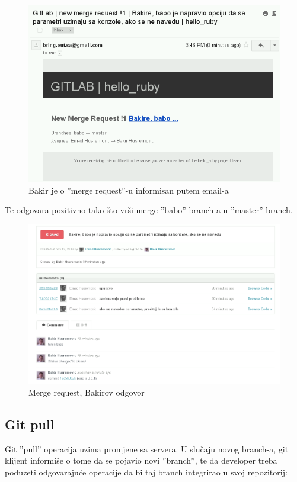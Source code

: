 \documentclass[times, utf8, seminar]{fit}
\begin{document}
\begin{figure}[H]
\centering
\includegraphics[width=15cm]{img/gitlab_merge_request_email_notification.png}
\caption{Bakir je o ''merge request''-u informisan putem email-a}
\end{figure}

Te odgovara pozitivno tako što vrši merge ''babo'' branch-a u ''master'' branch.
\begin{figure}[H]
\centering
\includegraphics[width=15cm]{img/gitlab_merge_request_answer.png}
\caption{Merge request, Bakirov odgovor}
\end{figure}

\subsection{Git pull}

Git ''pull'' operacija uzima promjene sa servera. U slučaju novog branch-a, git klijent informiše o tome da se pojavio novi ''branch'', te da developer treba poduzeti odgovarajuće operacije da bi taj branch integrirao u svoj repozitorij:
\end{document}
